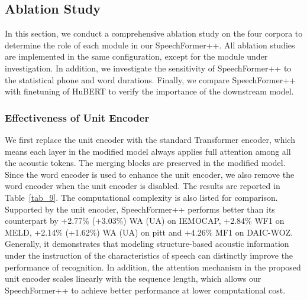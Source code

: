 \documentclass[lettersize,journal]{IEEEtran}
\begin{document}
\subsection{Ablation Study}
In this section, we conduct a comprehensive ablation study on the four corpora to determine the role of each module in our SpeechFormer++. All ablation studies are implemented in the same configuration, except for the module under investigation. In addition, we investigate the sensitivity of SpeechFormer++ to the statistical phone and word durations. Finally, we compare SpeechFormer++ with finetuning of HuBERT to verify the importance of the downstream model.

\subsubsection{Effectiveness of Unit Encoder} We first replace the unit encoder with the standard Transformer encoder, which means each layer in the modified model always applies full attention among all the acoustic tokens. The merging blocks are preserved in the modified model. Since the word encoder is used to enhance the unit encoder, we also remove the word encoder when the unit encoder is disabled. The results are reported in Table~\ref{tab_9}. The computational complexity is also listed for comparison. Supported by the unit encoder, SpeechFormer++ performs better than its counterpart by +2.77\% (+3.03\%) WA (UA) on IEMOCAP, +2.84\% WF1 on MELD, +2.14\% (+1.62\%) WA (UA) on pitt and +4.26\% MF1 on DAIC-WOZ. Generally, it demonstrates that modeling structure-based acoustic information under the instruction of the characteristics of speech can distinctly improve the performance of recognition. In addition, the attention mechanism in the proposed unit encoder scales linearly with the sequence length, which allows our SpeechFormer++ to achieve better performance at lower computational cost.
\end{document}
